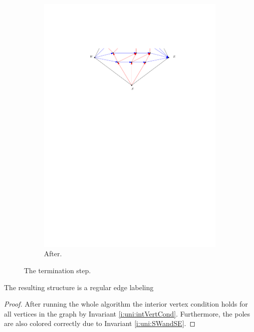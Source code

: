 \begin{figure}[b]
\begin{subfigure}[b]{0.45 \textwidth}
        \includegraphics[width =\textwidth]{unifiedAlgo/img/sweep/terminateAfter.pdf}
        \caption{After.}
    \end{subfigure}
    \caption{The termination step.}
    \label{fig:sweep:terminate}
  \end{figure}

  \begin{lemma}
    \label{lm:sweep:REL}
    The resulting structure is a regular edge labeling
  \end{lemma}

  \begin{proof}
    After running the whole algorithm the interior vertex condition holds for all vertices in the graph by Invariant \ref{i:uni:intVertCond}. Furthermore, the poles are also colored correctly due to Invariant \ref{i:uni:SWandSE}.
  \end{proof}

